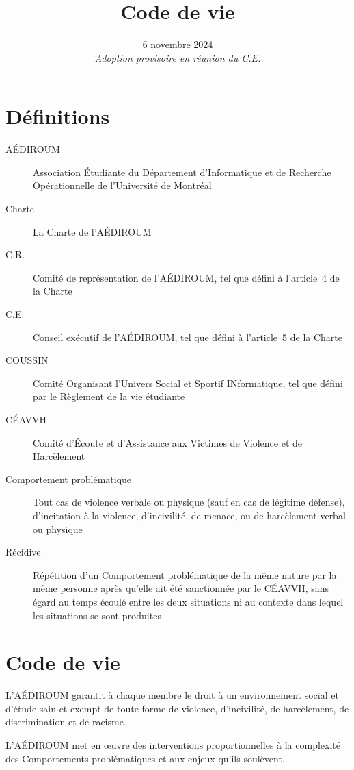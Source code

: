 \documentclass{aediroum}
\title{Code de vie}
\date{6 novembre 2024\\[.5em]\emph{Adoption provisoire en réunion du C.E.}}
\begin{document}
\maketitle

\section{Définitions}

\begin{description}
    \item[AÉDIROUM] Association Étudiante du Département d’Informatique et de Recherche Opérationnelle de l’Université de Montréal
    \item[Charte] La Charte de l’AÉDIROUM
    \item[C.R.] Comité de représentation de l’AÉDIROUM, tel que défini à l’article~4 de la Charte
    \item[C.E.] Conseil exécutif de l’AÉDIROUM, tel que défini à l’article~5 de la Charte
    \item[COUSSIN] Comité Organisant l’Univers Social et Sportif INformatique, tel que défini par le Règlement de la vie étudiante
    \item[CÉAVVH] Comité d’Écoute et d’Assistance aux Victimes de Violence et de Harcèlement
    \item[Comportement problématique] Tout cas de violence verbale ou physique (sauf en cas de légitime défense), d’incitation à la violence, d’incivilité, de menace, ou de harcèlement verbal ou physique
    \item[Récidive] Répétition d’un Comportement problématique de la même nature par la même personne après qu’elle ait été sanctionnée par le CÉAVVH, sans égard au temps écoulé entre les deux situations ni au contexte dans lequel les situations se sont produites
\end{description}

\section{Code de vie}

L’AÉDIROUM garantit à chaque membre le droit à un environnement social et d’étude sain et exempt de toute forme de violence, d’incivilité, de harcèlement, de discrimination et de racisme.

L’AÉDIROUM met en œuvre des interventions proportionnelles à la complexité des Comportements problématiques et aux enjeux qu’ils soulèvent.
\end{document}
